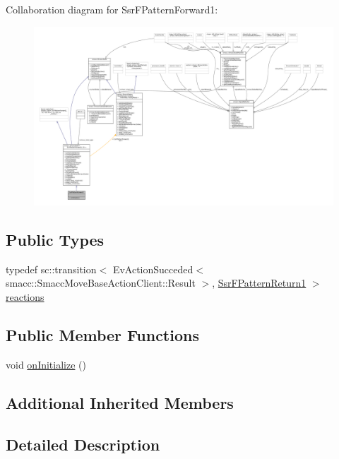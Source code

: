Collaboration diagram for Ssr\+F\+Pattern\+Forward1\+:
\nopagebreak
\begin{figure}[H]
\begin{center}
\leavevmode
\includegraphics[width=350pt]{structSsrFPatternForward1__coll__graph}
\end{center}
\end{figure}
\subsection*{Public Types}
\begin{DoxyCompactItemize}
\item 
typedef sc\+::transition$<$ Ev\+Action\+Succeded$<$ smacc\+::\+Smacc\+Move\+Base\+Action\+Client\+::\+Result $>$, \hyperlink{structSsrFPatternReturn1}{Ssr\+F\+Pattern\+Return1} $>$ \hyperlink{structSsrFPatternForward1_a9cde0bd6345d5017567b89aed9c923d7}{reactions}
\end{DoxyCompactItemize}
\subsection*{Public Member Functions}
\begin{DoxyCompactItemize}
\item 
void \hyperlink{structSsrFPatternForward1_a532baa064c9773096c8fd6ce430ac4b3}{on\+Initialize} ()
\end{DoxyCompactItemize}
\subsection*{Additional Inherited Members}


\subsection{Detailed Description}


